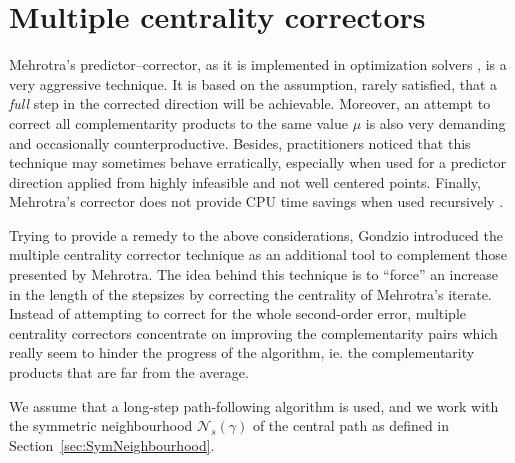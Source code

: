 %
%
\section{Multiple centrality correctors}
\label{sec:MultipleCC}

Mehrotra's predictor--corrector, as it is implemented in optimization 
solvers \cite{LustigMarstenShanno,Mehrotra92}, is a very aggressive 
technique. It is based on the assumption, rarely satisfied, that a 
{\it full} step in the corrected direction will be achievable.
Moreover, an attempt to correct all complementarity products to the 
same value $\mu$ is also very demanding and occasionally
counterproductive. 
Besides, practitioners noticed that this technique may sometimes 
behave erratically, especially when used for a predictor direction 
applied from highly infeasible and not well centered points. 
Finally, Mehrotra's corrector does not provide CPU time savings 
when used recursively \cite{CarpenterLustigMulveyShanno}.

Trying to provide a remedy to the above considerations, Gondzio 
\cite{Gondzio96} introduced the multiple centrality corrector technique 
as an additional tool to complement those presented by Mehrotra. 
The idea behind this technique is to ``force'' an increase in the 
length of the stepsizes by correcting the centrality of Mehrotra's 
iterate.
Instead of attempting to correct for the whole second-order error,
multiple centrality correctors 
concentrate on improving the complementarity pairs which really seem 
to hinder the progress of the algorithm, ie. the complementarity products 
that are far from the average.

We assume that a long-step path-following algorithm is used, 
and we work with the symmetric neighbourhood $\mathcal{N}_s(\gamma)$
of the central path as defined in Section~\ref{sec:SymNeighbourhood}.



